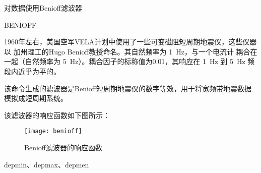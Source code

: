 \label{cmd:benioff}

对数据使用Benioff滤波器

\begin{SACSTX}
BENIOFF
\end{SACSTX}

1960年左右，美国空军VELA计划中使用了一些可变磁阻短周期地震仪，这些仪器以
加州理工的Hugo Benioff教授命名。其自然频率为 \SI{1}{\Hz}，与一个电流计
耦合在一起（自然频率为 \SI{5}{\Hz}）。耦合因子的标称值为0.01，其响应在
\SI{1}{\Hz} 到 \SI{5}{\Hz} 频段内近乎为平的。

该命令生成的滤波器是Benioff短周期地震仪的数字等效，用于将宽频带地震数据
模拟成短周期系统。

该滤波器的响应函数如下图所示：

\begin{figure}[H]
\centering
\texttt{[image: benioff]}
\caption{Benioff滤波器的响应函数}
\label{fig:benioff}
\end{figure}

depmin、depmax、depmen
